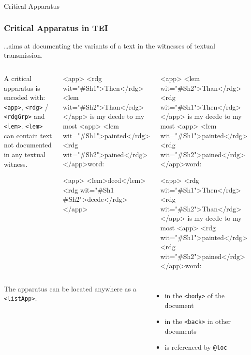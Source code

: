 \begin{frame}{Critical Apparatus}
\subsubsection{Critical Apparatus in TEI}
\dots aims at documenting the variants of a text in the witnesses of textual transmission.\medskip 

\begin{columns}
\small
A critical apparatus is encoded with:
\texttt{<app>}, \texttt{<rdg>} / \texttt{<rdgGrp>} and \texttt{<lem>}.
\texttt{<lem>} can contain text not documented in any textual witness.

\begin{xmlcode}
<app>
  <rdg wit="#Sh1">Then</rdg>
  <lem wit="#Sh2">Than</rdg>
</app> is my deede to my most  
<app>
  <lem wit="#Sh1">painted</rdg>
  <rdg wit="#Sh2">pained</rdg>
</app>word:

<app>
    <lem>deed</lem>
    <rdg wit="#Sh1 #Sh2">deede</rdg>
</app>
\end{xmlcode}

\begin{xmlcode}
<app>
  <lem wit="#Sh2">Than</rdg>
  <rdg wit="#Sh1">Then</rdg>
</app> is my deede to my most  
<app>
  <lem wit="#Sh1">painted</rdg>
  <rdg wit="#Sh2">pained</rdg>
</app>word:

<app>
  <rdg wit="#Sh1">Then</rdg>
  <rdg wit="#Sh2">Than</rdg>
</app> is my deede to my most  
<app>
  <rdg wit="#Sh1">painted</rdg>
  <rdg wit="#Sh2">pained</rdg>
</app>word:
\end{xmlcode}

\end{columns}

\framebreak



\begin{columns}
\small 

The apparatus can be located anywhere as a \texttt{<listApp>}:
\begin{itemize}\footnotesize
    \item in the \texttt{<body>} of the document 
    \item in the \texttt{<back>} in other documents
    \item is referenced by \texttt{@loc}
\end{itemize}


\end{columns}
\end{frame}
